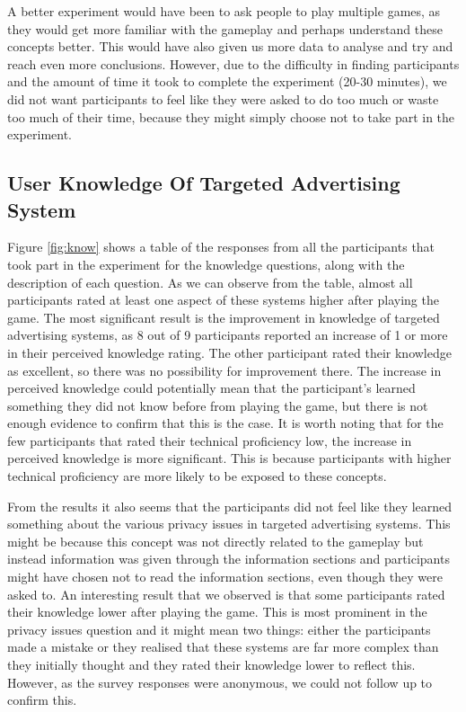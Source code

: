 \documentclass{l4proj}
\begin{document}
A better experiment would have been to ask people to play multiple games, as they would get more familiar with the gameplay and perhaps understand these concepts better. This would have also given us more data to analyse and try and reach even more conclusions. However, due to the difficulty in finding participants and the amount of time it took to complete the experiment (20-30 minutes), we did not want participants to feel like they were asked to do too much or waste too much of their time, because they might simply choose not to take part in the experiment.

\subsection{User Knowledge Of Targeted Advertising System}
Figure \ref{fig:know} shows a table of the responses from all the participants that took part in the experiment for the knowledge questions, along with the description of each question. As we can observe from the table, almost all participants rated at least one aspect of these systems higher after playing the game. The most significant result is the improvement in knowledge of targeted advertising systems, as 8 out of 9 participants reported an increase of 1 or more in their perceived knowledge rating. The other participant rated their knowledge as excellent, so there was no possibility for improvement there.
The increase in perceived knowledge could potentially mean that the participant's learned something they did not know before from playing the game, but there is not enough evidence to confirm that this is the case. It is worth noting that for the few participants that rated their technical proficiency low, the increase in perceived knowledge is more significant. This is because participants with higher technical proficiency are more likely to be exposed to these concepts. 

From the results it also seems that the participants did not feel like they learned something about the various privacy issues in targeted advertising systems. This might be because this concept was not directly related to the gameplay but instead information was given through the information sections and participants might have chosen not to read the information sections, even though they were asked to. An interesting result that we observed is that some participants rated their knowledge lower after playing the game. This is most prominent in the privacy issues question and it might mean two things: either the participants made a mistake or they realised that these systems are far more complex than they initially thought and they rated their knowledge lower to reflect this. However, as the survey responses were anonymous, we could not follow up to confirm this.
\end{document}
